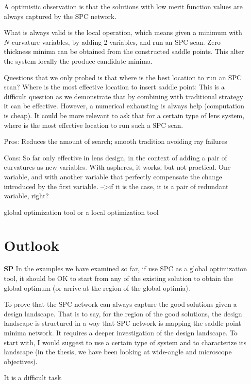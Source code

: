 A optimistic observation is that the solutions with low merit function values are always captured by the SPC network. 


What is always valid is the local operation, which means given a minimum with $N$ curvature variables, by adding $2$ variables, and run an SPC scan. Zero-thickness minima can be obtained from the constructed saddle points. This alter the system locally the produce candidate minima. 

Questions that we only probed is that where is the best location to run an SPC scan? 
Where is the most effective location to insert saddle point: 
This is a difficult question as we demonstrate that by combining with traditional strategy it can be effective. However, a numerical exhausting is always help (computation is cheap). It could be more relevant to ask that for a certain type of lens system, where is the most effective location to run such a SPC scan.  

Pros:
Reduces the amount of search; smooth tradition avoiding ray failures

Cons:
So far only effective in lens design, in the context of adding a pair of curvatures as new variables. With aspheres, it works, but not practical. 
One variable, and with another variable that perfectly compensate the change introduced by the first variable. -->if it is the case, it is a pair of redundant variable, right? 

global optimization tool or a local optimization tool

\section{Outlook}
\textbf{SP}
In the examples we have examined so far, if use SPC as a global optimization tool, it should be OK to start from any of the existing solution to obtain the global optimum (or arrive at the region of the global optimia). 

To prove that the SPC network can always capture the good solutions given a design landscape. That is to say, for the region of the good solutions, the design landscape is structured in a way that SPC network is mapping the saddle point - minima network. 
It requires a deeper investigation of the design landscape. To start with, I would suggest to use a certain type of system and to characterize its landscape (in the thesis, we have been looking at wide-angle and microscope objectives). 

It is a difficult task.

